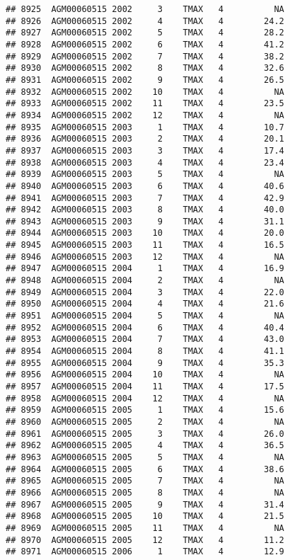 \documentclass{article}\usepackage[]{graphicx}\usepackage[]{color}
\makeatletter
\newenvironment{kframe}{%
 \def\at@end@of@kframe{}%
 \ifinner\ifhmode%
  \def\at@end@of@kframe{\end{minipage}}%
  \begin{minipage}{\columnwidth}%
 \fi\fi%
 \def\FrameCommand##1{\hskip\@totalleftmargin \hskip-\fboxsep
 \colorbox{shadecolor}{##1}\hskip-\fboxsep
     \hskip-\linewidth \hskip-\@totalleftmargin \hskip\columnwidth}%
 \MakeFramed {\advance\hsize-\width
   \@totalleftmargin\z@ \linewidth\hsize
   \@setminipage}}%
 {\par\unskip\endMakeFramed%
 \at@end@of@kframe}
\newenvironment{knitrout}{}{} %
\makeatother
\begin{document}
\begin{knitrout}
\begin{kframe}
\begin{verbatim}
## 8925  AGM00060515 2002     3    TMAX   4          NA
## 8926  AGM00060515 2002     4    TMAX   4        24.2
## 8927  AGM00060515 2002     5    TMAX   4        28.2
## 8928  AGM00060515 2002     6    TMAX   4        41.2
## 8929  AGM00060515 2002     7    TMAX   4        38.2
## 8930  AGM00060515 2002     8    TMAX   4        32.6
## 8931  AGM00060515 2002     9    TMAX   4        26.5
## 8932  AGM00060515 2002    10    TMAX   4          NA
## 8933  AGM00060515 2002    11    TMAX   4        23.5
## 8934  AGM00060515 2002    12    TMAX   4          NA
## 8935  AGM00060515 2003     1    TMAX   4        10.7
## 8936  AGM00060515 2003     2    TMAX   4        20.1
## 8937  AGM00060515 2003     3    TMAX   4        17.4
## 8938  AGM00060515 2003     4    TMAX   4        23.4
## 8939  AGM00060515 2003     5    TMAX   4          NA
## 8940  AGM00060515 2003     6    TMAX   4        40.6
## 8941  AGM00060515 2003     7    TMAX   4        42.9
## 8942  AGM00060515 2003     8    TMAX   4        40.0
## 8943  AGM00060515 2003     9    TMAX   4        31.1
## 8944  AGM00060515 2003    10    TMAX   4        20.0
## 8945  AGM00060515 2003    11    TMAX   4        16.5
## 8946  AGM00060515 2003    12    TMAX   4          NA
## 8947  AGM00060515 2004     1    TMAX   4        16.9
## 8948  AGM00060515 2004     2    TMAX   4          NA
## 8949  AGM00060515 2004     3    TMAX   4        22.0
## 8950  AGM00060515 2004     4    TMAX   4        21.6
## 8951  AGM00060515 2004     5    TMAX   4          NA
## 8952  AGM00060515 2004     6    TMAX   4        40.4
## 8953  AGM00060515 2004     7    TMAX   4        43.0
## 8954  AGM00060515 2004     8    TMAX   4        41.1
## 8955  AGM00060515 2004     9    TMAX   4        35.3
## 8956  AGM00060515 2004    10    TMAX   4          NA
## 8957  AGM00060515 2004    11    TMAX   4        17.5
## 8958  AGM00060515 2004    12    TMAX   4          NA
## 8959  AGM00060515 2005     1    TMAX   4        15.6
## 8960  AGM00060515 2005     2    TMAX   4          NA
## 8961  AGM00060515 2005     3    TMAX   4        26.0
## 8962  AGM00060515 2005     4    TMAX   4        36.5
## 8963  AGM00060515 2005     5    TMAX   4          NA
## 8964  AGM00060515 2005     6    TMAX   4        38.6
## 8965  AGM00060515 2005     7    TMAX   4          NA
## 8966  AGM00060515 2005     8    TMAX   4          NA
## 8967  AGM00060515 2005     9    TMAX   4        31.4
## 8968  AGM00060515 2005    10    TMAX   4        21.5
## 8969  AGM00060515 2005    11    TMAX   4          NA
## 8970  AGM00060515 2005    12    TMAX   4        11.2
## 8971  AGM00060515 2006     1    TMAX   4        12.9

\end{verbatim}
\end{kframe}
\end{knitrout}
\end{document}
